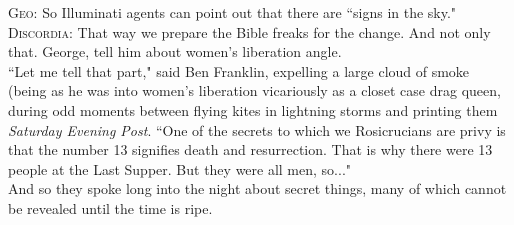 \textsc{Geo:} So Illuminati agents can point out that there are ``signs in the sky."\\
\textsc{Discordia:} That way we prepare the Bible freaks for the change. And not only that. George, tell him about women's liberation angle.\\
``Let me tell that part," said Ben Franklin, expelling a large cloud of smoke (being as he was into women's liberation vicariously as a closet case drag queen, during odd moments between flying kites in lightning storms and printing them \emph{Saturday Evening Post}. ``One of the secrets to which we Rosicrucians are privy is that the number 13 signifies death and resurrection. That is why there were 13 people at the Last Supper. But they were all men, so..."\\
And so they spoke long into the night about secret things, many of which cannot be revealed until the time is ripe.